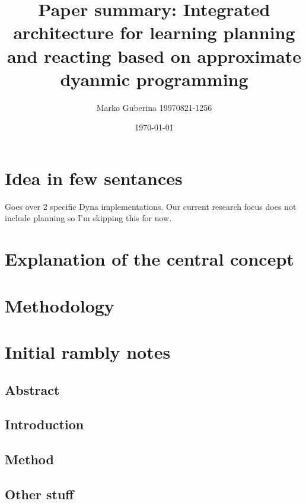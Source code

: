 \documentclass{article}
\title{Paper summary: Integrated architecture for learning planning and reacting based on approximate dyanmic programming}
\date{\today}
\author{Marko Guberina 19970821-1256}
\begin{document}
\maketitle



\section{Idea in few sentances}
Goes over 2 specific Dyna implementations.
Our current research focus does not include planning so I'm skipping this for now.


\section{Explanation of the central concept}




\section{Methodology}


\section{Initial rambly notes}

\subsection{Abstract}

\subsection{Introduction}




\subsection{Method}

\subsection{Other stuff}
\end{document}
